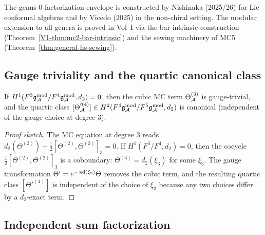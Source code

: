 \begin{remark}
The genus-$0$ factorization envelope is constructed by Nishinaka
(2025/26) for Lie conformal algebras and by Vicedo (2025) in the
non-chiral setting. The modular extension to all genera is
proved in Vol~I via the bar-intrinsic construction
(Theorem~\ref*{V1-thm:mc2-bar-intrinsic}) and the sewing machinery
of MC5 (Theorem~\ref{thm:general-hs-sewing}).
\end{remark}


\subsection{Gauge triviality and the quartic canonical class}

\begin{theorem}
\label{thm:cubic-gauge-triviality}
If $H^1(F^3\mathfrak{g}_{\mathcal{A}}^{\mathrm{mod}} / F^4\mathfrak{g}_{\mathcal{A}}^{\mathrm{mod}}, d_2) = 0$, then the cubic MC
term $\Theta_{\mathcal{A}}^{(3)}$ is gauge-trivial, and the quartic class
$[\Theta'^{(4)}_{\mathcal{A}}] \in H^2(F^4\mathfrak{g}_{\mathcal{A}}^{\mathrm{mod}} / F^5\mathfrak{g}_{\mathcal{A}}^{\mathrm{mod}}, d_2)$ is
canonical (independent of the gauge choice at degree $3$).
\end{theorem}

\begin{proof}[Proof sketch]
The MC equation at degree $3$ reads
$d_2(\Theta^{(3)}) + \frac{1}{2}[\Theta^{(2)}, \Theta^{(2)}]_3 = 0$.
If $H^1(F^3/F^4, d_2) = 0$, then the cocycle
$\frac{1}{2}[\Theta^{(2)}, \Theta^{(2)}]_3$ is a coboundary:
$\Theta^{(3)} = d_2(\xi_3)$ for some $\xi_3$. The gauge
transformation $\Theta' = e^{-\operatorname{ad}(\xi_3)}\Theta$ removes the
cubic term, and the resulting quartic class $[\Theta'^{(4)}]$ is
independent of the choice of $\xi_3$ because any two choices differ
by a $d_2$-exact term.
\end{proof}


\subsection{Independent sum factorization}

